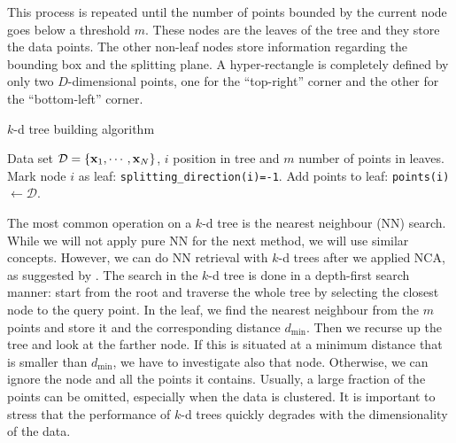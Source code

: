 This process is repeated until the number of points bounded by the current node goes below a threshold $m$. These nodes are the leaves of the tree and they store the data points. The other non-leaf nodes store information regarding the bounding box and the splitting plane. A hyper-rectangle is completely defined by only two $D$-dimensional points, one for the ``top-right'' corner and the other for the ``bottom-left'' corner. 

	\begin{algorithm} 
		\caption{$k$-d tree building algorithm} 
		\label{alg:kd-tree-build}  
		\begin{algorithmic}[1]                    %
			\REQUIRE Data set $\mathcal{D}=\{\mathbf{x}_1,\cdots,\mathbf{x}_N\}$, $i$ position in tree
and $m$ number of points in leaves.
				\STATE Mark node $i$ as leaf: \texttt{splitting\_direction(i)=-1}.
				\STATE Add points to leaf: \texttt{points(i)}$\leftarrow \mathcal{D}$.
				\RETURN
			\ENDIF
		\end{algorithmic}
	\end{algorithm}
	
 	The most common operation on a $k$-d tree is the nearest neighbour (NN) search. While we will not apply pure NN for the next method, we will use similar concepts. However, we can do NN retrieval with $k$-d trees after we applied NCA, as suggested by \citet{goldberger2004}. The search in the $k$-d tree is done in a depth-first search manner: start from the root and traverse the whole tree by selecting the closest node to the query point. In the leaf, we find the nearest neighbour from the $m$ points and store it and the corresponding distance $d_\text{min}$. Then we recurse up the tree and look at the farther node. If this is situated at a minimum distance that is smaller than $d_\text{min}$, we have to investigate also that node. Otherwise, we can ignore the node and all the points it contains. Usually, a large fraction of the points can be omitted, especially when the data is clustered.
 	It is important to stress that the performance of $k$-d trees quickly degrades with the dimensionality of the data. 
 	
